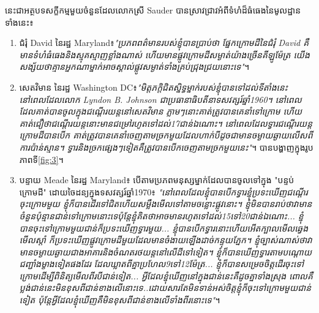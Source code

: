 \documentclass[10pt,twocolumn,letterpaper]{article}
\begin{document}
	នេះជាអត្ថបទសក្ខីកម្មមួយចំនួនដែលលោកស្រី Sauder បានស្រាវជ្រាវ​អំពីទំហំដ៏ធំធេងនៃមូលដ្ឋានទាំងនេះ៖
\begin{flushleft}
\begin{enumerate}
    \item ជំរុំ David នៃរដ្ឋ Maryland៖\textit{"ប្រភពពត៌មានរបស់ខ្ញុំបានប្រាប់ថា ផ្នែកក្រោមដីនៃជំរុំ David គឺមានទំហំធំធេងនិងស្មុគស្មាញខ្លាំងណាស់ ហើយមានផ្លូវក្រោមដីសម្ងាត់យ៉ាងច្រើនគីឡូម៉ែត្រ យើងសង្ស័យថាគ្មានអ្នកណាម្នាក់អាចស្គាល់ផ្លូវសម្ងាត់ទាំងគ្រប់ជ្រុងជ្រយនោះទេ"}\cite{22}។
    \item សេតវិមាន នៃរដ្ឋ Washington DC៖\textit{"មិត្តភក្តិជិតស្និទ្ធម្នាក់របស់ខ្ញុំបានទៅដល់ទីតាំងនេះនៅពេលដែលលោក Lyndon B. Johnson ជាប្រធានាធិបតីនាទសវត្សរ៍ឆ្នាំ1960។ នៅពេលដែលគាត់បានចូលក្នុងជណ្តើរយន្តនៅសេតវិមាន ភ្លាមៗនោះគាត់ត្រូវបានគេនាំទៅក្រោម ហើយគាត់ជឿថាជណ្តើរយន្តនោះមានជម្រៅរហូតទៅដល់17ជាន់ឯណោះ។ នៅពេលដែលទ្វារជណ្តើរយន្តក្រោមដីបានបើក  គាត់ត្រូវបានគេនាំចេញតាមច្រកមួយដែលហាក់បីដូចជាមានចម្ងាយឆ្ងាយលើសពីការប៉ាន់ស្មាន។ ទ្វារនិងច្រកផ្សេងៗទៀតគឺត្រូវបានបើកចេញតាមច្រកមួយនេះ"}\cite{22}។ បានបង្ហាញក្នុងរូបភាពទី\ref{fig:3}។
   \item បន្ទាយ Meade នៃរដ្ឋ Maryland៖ បើតាមប្រភពមនុស្សម្នាក់ដែលបានចូលទៅក្នុង "បន្ទប់ក្រោមដី" ដោយចៃដន្យក្នុងទសវត្សរ៍ឆ្នាំ1970៖ \textit{"នៅពេលដែលខ្ញុំបានបើកទ្វារខ្ញុំប្រទះឃើញជណ្តើរចុះក្រោមមួយ ខ្ញុំក៏បានដើរទៅជិតហើយសម្លឹងមើលទៅតាមចន្លោះផ្លូវនោះ។ ខ្ញុំមិនបានរាប់ថាវាមានចំនួនប៉ុន្មានជាន់ទៅក្រោមនោះទេ​ ប៉ុន្តែខ្ញុំគិតថាអាចមានរហូតទៅដល់15ទៅ20ជាន់ឯណោះ... ខ្ញុំបានចុះទៅក្រោមមួយជាន់ក៏ប្រទះឃើញទ្វារមួយ... ខ្ញុំបានបើកទ្វារនោះហើយអើតក្បាលមើលឆ្វេងមើលស្តាំ ក៏ប្រទះឃើញផ្លូវក្រោមដីមួយដែលមានចំងាយឡើងដាច់កន្ទុយភ្នែក។ ខ្ញុំច្បាស់ណាស់ថាវាមានចម្ងាយឆ្ងាយជាងអាគារនិងចំណតរថយន្តនៅលើដីទៅទៀត។ ខ្ញុំក៏បានឃើញទ្វារតាមបណ្តោយជញ្ជាំងម្ខាងទៀតផងដែរ ដែលឃ្លាតពីគ្នាប្រហែល9ទៅ12ម៉ែត្រ... ខ្ញុំក៏បានសម្រេចចិត្តដើរចុះទៅក្រោមដើម្បីពិនិត្យមើលពីរបីជាន់ទៀត... អ្វីដែលខ្ញុំឃើញនៅក្នុងជាន់នេះគឺដូចគ្នាទាំងស្រុង ពោលគឺប្លង់ជាន់នេះមិនខុសពីជាន់ខាងលើនោះទេ..ដោយសារតែមិនទាន់អស់ចិត្តខ្ញុំក៏ចុះទៅក្រោមមួយជាន់ទៀត ប៉ុន្តែអ្វីដែលខ្ញុំឃើញគឺមិនខុសពីជាន់ខាងលើទាំងពីរនោះទេ"}\cite{22}។
\end{enumerate}
\end{flushleft}
\end{document}
